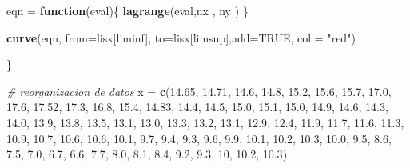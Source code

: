 \documentclass[]{article}
\newenvironment{Shaded}{\begin{snugshade}}{\end{snugshade}}
\newcommand{\KeywordTok}[1]{\textcolor[rgb]{0.13,0.29,0.53}{\textbf{#1}}}
\newcommand{\DataTypeTok}[1]{\textcolor[rgb]{0.13,0.29,0.53}{#1}}
\newcommand{\DecValTok}[1]{\textcolor[rgb]{0.00,0.00,0.81}{#1}}
\newcommand{\FloatTok}[1]{\textcolor[rgb]{0.00,0.00,0.81}{#1}}
\newcommand{\StringTok}[1]{\textcolor[rgb]{0.31,0.60,0.02}{#1}}
\newcommand{\CommentTok}[1]{\textcolor[rgb]{0.56,0.35,0.01}{\textit{#1}}}
\newcommand{\OtherTok}[1]{\textcolor[rgb]{0.56,0.35,0.01}{#1}}
\newcommand{\ControlFlowTok}[1]{\textcolor[rgb]{0.13,0.29,0.53}{\textbf{#1}}}
\newcommand{\NormalTok}[1]{#1}
\begin{document}
\begin{Shaded}
\begin{Highlighting}[]
  
\NormalTok{  eqn =}\StringTok{ }\ControlFlowTok{function}\NormalTok{(eval)\{ }\KeywordTok{lagrange}\NormalTok{(eval,nx , ny ) \}}
  
  \KeywordTok{curve}\NormalTok{(eqn, }\DataTypeTok{from=}\NormalTok{lisx[liminf], }\DataTypeTok{to=}\NormalTok{lisx[limsup],}\DataTypeTok{add=}\OtherTok{TRUE}\NormalTok{, }\DataTypeTok{col =} \StringTok{"red"}\NormalTok{)}
  
\NormalTok{\}}


\CommentTok{# reorganizacion de datos }
\NormalTok{x =}\StringTok{ }\KeywordTok{c}\NormalTok{(}\FloatTok{14.65}\NormalTok{, }\FloatTok{14.71}\NormalTok{, }\FloatTok{14.6}\NormalTok{, }\FloatTok{14.8}\NormalTok{, }\FloatTok{15.2}\NormalTok{, }\FloatTok{15.6}\NormalTok{, }\FloatTok{15.7}\NormalTok{, }\FloatTok{17.0}\NormalTok{, }\FloatTok{17.6}\NormalTok{, }\FloatTok{17.52}\NormalTok{, }\FloatTok{17.3}\NormalTok{, }
  \FloatTok{16.8}\NormalTok{, }\FloatTok{15.4}\NormalTok{, }\FloatTok{14.83}\NormalTok{, }\FloatTok{14.4}\NormalTok{, }\FloatTok{14.5}\NormalTok{, }
  \FloatTok{15.0}\NormalTok{, }\FloatTok{15.1}\NormalTok{, }\FloatTok{15.0}\NormalTok{, }\FloatTok{14.9}\NormalTok{, }\FloatTok{14.6}\NormalTok{, }\FloatTok{14.3}\NormalTok{, }\FloatTok{14.0}\NormalTok{, }\FloatTok{13.9}\NormalTok{, }\FloatTok{13.8}\NormalTok{, }\FloatTok{13.5}\NormalTok{, }\FloatTok{13.1}\NormalTok{, }\FloatTok{13.0}\NormalTok{, }
  \FloatTok{13.3}\NormalTok{, }\FloatTok{13.2}\NormalTok{, }\FloatTok{13.1}\NormalTok{, }\FloatTok{12.9}\NormalTok{, }\FloatTok{12.4}\NormalTok{, }\FloatTok{11.9}\NormalTok{, }\FloatTok{11.7}\NormalTok{, }\FloatTok{11.6}\NormalTok{, }\FloatTok{11.3}\NormalTok{, }\FloatTok{10.9}\NormalTok{, }
  \FloatTok{10.7}\NormalTok{, }\FloatTok{10.6}\NormalTok{, }\FloatTok{10.6}\NormalTok{, }\FloatTok{10.1}\NormalTok{, }\FloatTok{9.7}\NormalTok{, }\FloatTok{9.4}\NormalTok{, }\FloatTok{9.3}\NormalTok{, }\FloatTok{9.6}\NormalTok{, }\FloatTok{9.9}\NormalTok{, }\FloatTok{10.1}\NormalTok{, }\FloatTok{10.2}\NormalTok{, }\FloatTok{10.3}\NormalTok{,  }\FloatTok{10.0}\NormalTok{, }\FloatTok{9.5}\NormalTok{, }
  \FloatTok{8.6}\NormalTok{, }\FloatTok{7.5}\NormalTok{, }\FloatTok{7.0}\NormalTok{, }\FloatTok{6.7}\NormalTok{, }\FloatTok{6.6}\NormalTok{, }\FloatTok{7.7}\NormalTok{, }
  \FloatTok{8.0}\NormalTok{, }\FloatTok{8.1}\NormalTok{, }\FloatTok{8.4}\NormalTok{, }\FloatTok{9.2}\NormalTok{, }\FloatTok{9.3}\NormalTok{, }\DecValTok{10}\NormalTok{, }\FloatTok{10.2}\NormalTok{, }\FloatTok{10.3}\NormalTok{)}


\end{Highlighting}
\end{Shaded}
\end{document}
